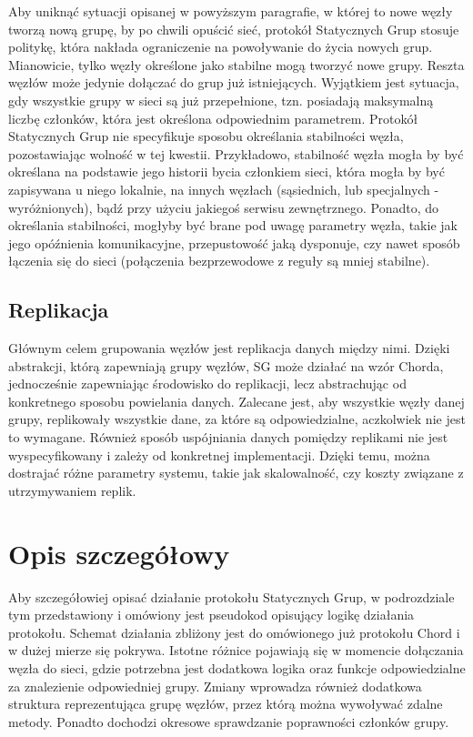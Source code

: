 \documentclass[12pt, twoside, openany]{report}
\begin{document}
Aby uniknąć sytuacji opisanej w powyższym paragrafie, w której to nowe węzły tworzą nową grupę, by po chwili opuścić sieć, protokół Statycznych Grup stosuje politykę, która nakłada ograniczenie na powoływanie do życia nowych grup. Mianowicie, tylko węzły określone jako stabilne mogą tworzyć nowe grupy. Reszta węzłów może jedynie dołączać do grup już istniejących. Wyjątkiem jest sytuacja, gdy wszystkie grupy w sieci są już przepełnione, tzn. posiadają maksymalną liczbę członków, która jest określona odpowiednim parametrem. Protokół Statycznych Grup nie specyfikuje sposobu określania stabilności węzła, pozostawiając wolność w tej kwestii. Przykładowo, stabilność węzła mogła by być określana na podstawie jego historii bycia członkiem sieci, która mogła by być zapisywana u niego lokalnie, na innych węzłach (sąsiednich, lub specjalnych - wyróżnionych), bądź przy użyciu jakiegoś serwisu zewnętrznego. Ponadto, do określania stabilności, mogłyby być brane pod uwagę parametry węzła, takie jak jego opóźnienia komunikacyjne, przepustowość jaką dysponuje, czy nawet sposób łączenia się do sieci (połączenia bezprzewodowe z reguły są mniej stabilne).

\subsection{Replikacja}
Głównym celem grupowania węzłów jest replikacja danych między nimi. Dzięki abstrakcji, którą zapewniają grupy węzłów, SG może działać na wzór Chorda, jednocześnie zapewniając środowisko do replikacji, lecz abstrachując od konkretnego sposobu powielania danych. Zalecane jest, aby wszystkie węzły danej grupy, replikowały wszystkie dane, za które są odpowiedzialne, aczkolwiek nie jest to wymagane. Również sposób uspójniania danych pomiędzy replikami nie jest wyspecyfikowany i zależy od konkretnej implementacji. Dzięki temu, można dostrajać różne parametry systemu, takie jak skalowalność, czy koszty związane z utrzymywaniem replik.

\section{Opis szczegółowy}

Aby szczegółowiej opisać działanie protokołu Statycznych Grup, w podrozdziale tym przedstawiony i omówiony jest pseudokod opisujący logikę działania protokołu. Schemat działania zbliżony jest do omówionego już protokołu Chord i w dużej mierze się pokrywa. Istotne różnice pojawiają się w momencie dołączania węzła do sieci, gdzie potrzebna jest dodatkowa logika oraz funkcje odpowiedzialne za znalezienie odpowiedniej grupy. Zmiany wprowadza również dodatkowa struktura reprezentująca grupę węzłów, przez którą można wywoływać zdalne metody. Ponadto dochodzi okresowe sprawdzanie poprawności członków grupy.
\end{document}
